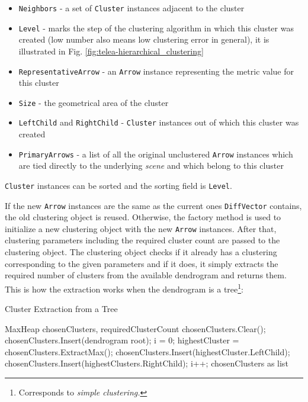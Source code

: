 \begin{itemize}
\item \verb+Neighbors+ - a set of \verb+Cluster+ instances adjacent to the cluster
\item \verb+Level+ - marks the step of the clustering algorithm in which this cluster was created (low number also means low clustering error in general), it is illustrated in Fig. \ref{fig:telea-hierarchical_clustering}
\item \verb+RepresentativeArrow+ - an \verb+Arrow+ instance representing the metric value for this cluster
\item \verb+Size+ - the geometrical area of the cluster
\item \verb+LeftChild+ and \verb+RightChild+ - \verb+Cluster+ instances out of which this cluster was created
\item \verb+PrimaryArrows+ - a list of all the original unclustered \verb+Arrow+ instances which are tied directly to the underlying {\it scene} and which belong to this cluster
\end{itemize}

\verb+Cluster+ instances can be sorted and the sorting field is \verb+Level+.

If the new \verb+Arrow+ instances are the same as the current ones \verb+DiffVector+ contains, the old clustering object is reused. Otherwise, the factory method is used to initialize a new clustering object with the new \verb+Arrow+ instances. After that, clustering parameters including the required cluster count are passed to the clustering object. The clustering object checks if it already has a clustering corresponding to the given parameters and if it does, it simply extracts the required number of clusters from the available dendrogram and returns them. This is how the extraction works when the dendrogram is a tree\footnote{Corresponds to {\it simple clustering.}}:

\begin{algorithm}[H]
\caption{Cluster Extraction from a Tree}
\begin{algorithmic}[1]

\Require MaxHeap chosenClusters, requiredClusterCount
\Statex
\State chosenClusters.Clear();
\State chosenClusters.Insert(dendrogram root);
\State i = 0;
	\State highestCluster = chosenClusters.ExtractMax();
    \State chosenClusters.Insert(highestCluster.LeftChild);
    \State chosenClusters.Insert(highestClusters.RightChild);
    \State i++;
\EndWhile
\Statex
\Return chosenClusters as list
\end{algorithmic}
\end{algorithm}

